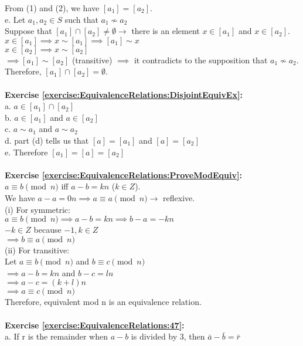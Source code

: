 From (1) and (2), we have $[a_1]=[a_2]$.\\
e. Let $a_1,a_2 \in S$ such that $a_1 \not\sim a_2$\\
Suppose that $[a_1]\cap[a_2]\neq\emptyset \to$ there is an element $x\in[a_1]$ and $x\in[a_2]$.\\
$x\in[a_1] \implies x\sim [a_1] \implies [a_1]\sim x$\\
$x\in[a_2] \implies x\sim [a_2]$\\
$\implies [a_1]\sim[a_2]$ (transitive) $\implies$  it contradicts to the supposition that $a_1 \not\sim a_2$.\\
Therefore, $[a_1]\cap[a_2]=\emptyset$.\\
\\
\textbf{Exercise \ref{exercise:EquivalenceRelations:DisjointEquivEx}:}\\
a. $a\in[a_1]\cap[a_2]$\\
b. $a\in[a_1]$ and $a\in[a_2]$\\
c. $a\sim a_1$ and $a\sim a_2$\\
d. part (d) tells us that $[a]=[a_1]$ and $[a]=[a_2]$\\
e. Therefore $[a_1]=[a]=[a_2]$\\
\\
\textbf{Exercise \ref{exercise:EquivalenceRelations:ProveModEquiv}:}\\
$a\equiv b\pmod{n}$ iff $a-b=kn$ ($k\in Z$).\\
We have $a-a=0n \implies a\equiv a\pmod{n} \to$ reflexive.\\
(i) For symmetric:\\
$a\equiv b\pmod{n} \implies a-b=kn \implies b-a=-kn$\\
$-k\in Z$ because $-1,k\in Z$\\
$\implies b\equiv a\pmod{n}$\\
(ii) For transitive:\\
Let $a\equiv b\pmod{n}$ and $b\equiv c\pmod{n}$\\
$\implies a-b=kn$ and $b-c=ln$\\
$\implies a-c=(k+l)n$\\
$\implies a\equiv c\pmod{n}$\\
Therefore, equivalent mod n is an equivalence relation.\\
\\
\textbf{Exercise \ref{exercise:EquivalenceRelations:47}:}\\
a. If r is the remainder when $a-b$ is divided by 3, then $\bar{a}-\bar{b}=\bar{r}$\\
